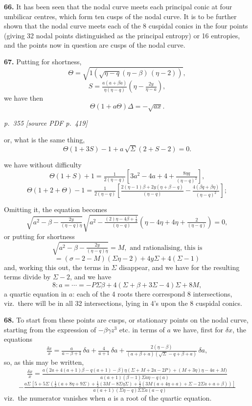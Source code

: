 \documentclass[11pt,a4paper]{article}
\newcommand{\pagemarker}[2]{\par\bigskip\noindent\textit{p.~#1 [source PDF p.~#2]}\par\smallskip}
\begin{document}
\textbf{66.} It has been seen that the nodal curve meets each principal conic at four umbilicar centres, which form ten cusps of the nodal curve. It is to be further shown that the nodal curve meets each of the 8 cuspidal conics in the four points (giving 32 nodal points distinguished as the principal entropy) or 16 entropies, and the points now in question are cusps of the nodal curve.

\textbf{67.} Putting for shortness,
\[
\Theta = \sqrt{1\!\left(\!\sqrt{\eta - q}(\eta - \beta)\,(\eta - 2)\right)},
\]
\[
S = \tfrac{a(a + \beta a)}{\eta(\eta - q)}\!\left(\eta - \tfrac{2y}{\eta - a}\right),
\]
we have then
\[
\Theta(1 + a\Theta)\Delta = -\sqrt{a x}.
\]

\clearpage

\bigskip
\pagemarker{355}{419}
\smallskip

or, what is the same thing,
\[
\Theta(1 + 3S) - 1 + a\,\sqrt{\Sigma}(2 + S - 2) = 0.
\]

we have without difficulty
\[
\Theta(1 + S) + 1 = \tfrac{1}{2(\eta - q)}[3a^2 - 4a + 4 + \tfrac{8\eta q}{(\eta - q)^2}],
\]
\[
\Theta(1 + 2 + \Theta) - 1 = \tfrac{1}{2(\eta - q)}\!\left[\tfrac{2(\eta - 1)\beta + 2y(\eta + \beta - q)}{(\eta - q)} - \tfrac{4(\beta q + \beta\eta)}{(\eta - q)^2}\right];
\]

Omitting it, the equation becomes
\[
\sqrt{a^2 - \beta - \tfrac{2y}{(\eta - q)\eta}}\sqrt{a^2 - \tfrac{(2)\eta - 4\beta + \tfrac{1}{2}}{(\eta - q)}}\!\left(\eta - 4\eta + 4\eta + \tfrac{2}{(\eta - q)}\right) = 0,
\]
or putting for shortness
\[
\sqrt{a^2 - \beta - \tfrac{2y}{(\eta - q)\eta}} = M,\text{ and rationalising, this is}
\]
\[
= (\sigma - 2 - M)(\Sigma\eta - 2) + 4y\Sigma + 4(\Sigma - 1)
\]
and, working this out, the terms in $\Sigma$ disappear, and we have for the resulting terms divide by $\Sigma - 2$, and we have
\[
8 : a = \cdots = -P\Sigma\beta + 4(\Sigma + \beta + 3\Sigma - 4)\Sigma + 8M,
\]
a quartic equation in $a$: each of the 4 roots there correspond 8 intersections, viz.\ there will be in all 32 intersections, lying in 4's upon the 8 cuspidal conics.

\textbf{68.} To start from these points are cusps, or stationary points on the nodal curve, starting from the expression of $-\beta\gamma z^3$ etc. in terms of $a$ we have, first for $\delta x$, the equations
\[
\tfrac{\delta x}{x} = \tfrac{a}{a - \beta + 1}\,\delta a + \tfrac{4}{a + 1}\,\delta a + \tfrac{2(\eta - \beta)}{(a + \beta + a)(\sqrt{\Sigma} - q + \beta + a)}\,\delta a,
\]
so, as this may be written,
\[
\tfrac{\delta x}{x} = \tfrac{a(2a + 4(a + 1)\beta - q(a + 1) - \beta)\eta(\Sigma + M + 2a - 2P) + (M + 3\eta)\eta - 4a + M)}{a(a + 1)(\beta - 1)\Sigma a\eta - q(a)}
\]
\[
- \tfrac{a\Sigma\,[5 + 5\Sigma\,(\tfrac{1}{2}(a + 8\eta + 9\Sigma) + \tfrac{1}{2}(3M - 8\Sigma\eta\Sigma) + \tfrac{1}{2}(3M(a + 4\eta + a) + \Sigma - 2\Sigma a + a + \beta))]}{a(a + 1)(\Sigma\eta - q)\Sigma\Sigma a(a - q)}
\]
viz.\ the numerator vanishes when $a$ is a root of the quartic equation.
\end{document}
